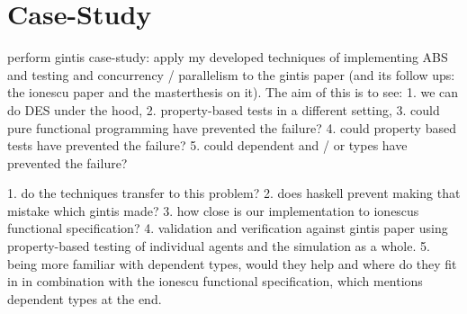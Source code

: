 \section{Case-Study}
perform gintis case-study: apply my developed techniques of implementing ABS and testing and concurrency / parallelism to the gintis paper (and its follow ups: the ionescu paper and the masterthesis on it). 
The aim of this is to see: 
1. we can do DES under the hood, 2. property-based tests in a different setting, 3. could pure functional programming have prevented the failure? 4. could property based tests have prevented the failure? 5. could dependent and / or types have prevented the failure? 

1. do the techniques transfer to this problem? 
2. does haskell prevent making that mistake which gintis made? 
3. how close is our implementation to ionescus functional specification? 
4. validation and verification against gintis paper using property-based testing of individual agents and the simulation as a whole. 
5. being more familiar with dependent types, would they help and where do they fit in in combination with the ionescu functional specification, which mentions dependent types at the end.